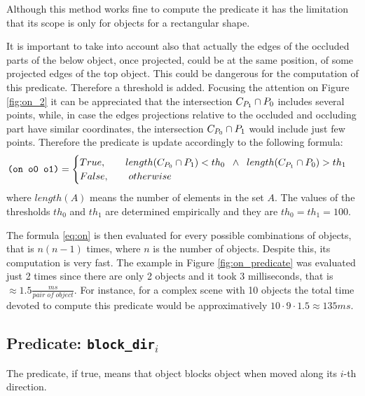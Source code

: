 Although this method works fine to compute the  predicate it has the limitation that its scope is only for objects for a rectangular shape.

It is important to take into account also that actually the edges of the occluded parts of the below object, once projected, could be at the same position, of some projected edges of the top object. This could be dangerous for the computation of this predicate. Therefore a threshold is added. Focusing the attention on Figure \ref{fig:on_2} it can be appreciated that the intersection ${\sc C_{P_{1}}} \cap {\sc P_{0}}$ includes several points, while, in case the edges projections relative to the occluded and occluding part have similar coordinates, the intersection ${\sc C_{P_{0}}} \cap {\sc P_{1}}$ would include just few points. Therefore the  predicate is update accordingly to the following formula:
\begin{equation}
\texttt{(on o0 o1)} =
\begin{cases}
{\sc True}, \qquad length({\sc C_{P_{0}}} \cap {\sc P_{1}}) < th_0 \;\; \wedge \;\; length({\sc C_{P_{1}}} \cap {\sc P_{0}}) > th_1 \\
{\sc False}, \qquad otherwise
\end{cases}
\label{eq:on}
\end{equation}
where $length(A)$ means the number of elements in the set $A$.
The values of the thresholds $th_0$ and $th_1$ are determined empirically and they are $th_0=th_1=100$.

The formula \ref{eq:on} is then evaluated for every possible combinations of objects, that is $n(n-1)$ times, where $n$ is the number of objects. Despite this, its computation is very fast. The example in Figure \ref{fig:on_predicate} was evaluated just 2 times since there are only 2 objects and it took $3$ milliseconds, that is $\approx 1.5 \frac{ms}{pair \; of \; object}$. For instance, for a complex scene with 10 objects the total time devoted to compute this predicate would be approximatively $10 \cdot 9 \cdot 1.5 \approx 135 ms$.



\subsection{Predicate: \texttt{block\_dir$_i$}}
The  predicate, if true, means that object  blocks object  when moved along its $i$-th direction. 

